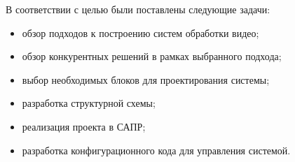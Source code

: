 В соответствии с целью были поставлены следующие задачи:
\begin{itemize}
  \item обзор подходов к построению систем обработки видео;
  \item обзор конкурентных решений в рамках выбранного подхода;
  \item выбор необходимых блоков для проектирования системы;
  \item разработка структурной схемы;
  \item реализация проекта в САПР;
  \item разработка конфигурационного кода для управления системой.
\end{itemize}

